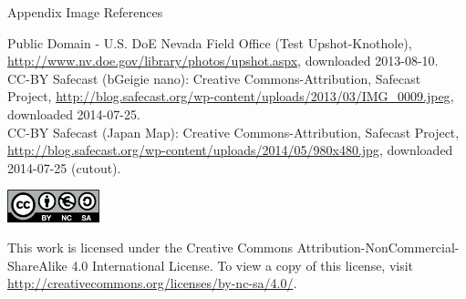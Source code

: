 \documentclass[presentation]{beamer}
\begin{document}
\begin{frame}[label=sec-7-8]{Appendix Image References}
\fontsize{3pt}{3.6}\selectfont

Public Domain - U.S. DoE Nevada Field Office (Test Upshot-Knothole), \url{http://www.nv.doe.gov/library/photos/upshot.aspx}, downloaded 2013-08-10.\\[0.3em]

CC-BY Safecast (bGeigie nano): Creative Commons-Attribution, Safecast Project, \url{http://blog.safecast.org/wp-content/uploads/2013/03/IMG_0009.jpeg}, downloaded 2014-07-25.\\[0.3em]

CC-BY Safecast (Japan Map): Creative Commons-Attribution, Safecast Project, \url{http://blog.safecast.org/wp-content/uploads/2014/05/980x480.jpg}, downloaded 2014-07-25 (cutout).\\[0.3em]
\end{frame}
\begin{frame}[label=sec-7-9]{}

\begin{center}

\includegraphics[width=0.2\textwidth]{by-nc-sa_eu.png}

This work is licensed under the Creative Commons Attribution-NonCommercial-ShareAlike 4.0 International License. To view a copy of this license, visit \url{http://creativecommons.org/licenses/by-nc-sa/4.0/}.
\end{center}
\end{frame}
\end{document}
